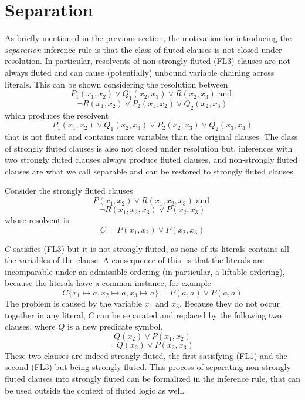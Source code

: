 \section{Separation}\label{sec:separation}
As briefly mentioned in the previous section, the motivation for introducing the \emph{separation} inference rule is that the class of fluted clauses is not closed under resolution.
In particular, resolvents of non-strongly fluted (FL3)-clauses are not always fluted and can cause (potentially) unbound variable chaining across literals.
This can be shown considering the resolution between
  \[
    P_1(x_1,x_2) \lor Q_1(x_2,x_3) \lor R(x_2,x_3) \text{ and }
  \]
  \[
  \neg R(x_1,x_2) \lor P_2(x_1,x_2) \lor Q_2(x_2,x_3)
  \]
which produces the resolvent
  \[
    P_1(x_1,x_2) \lor Q_1(x_2,x_3) \lor P_2(x_2,x_3) \lor Q_2(x_3,x_4)
  \]
that is not fluted and contains more variables than the original clauses.
The class of strongly fluted clauses is also not closed under resolution but, inferences with two strongly fluted clauses always produce fluted clauses, and non-strongly fluted clauses are what we call separable and can be restored to strongly fluted clauses.

Consider the strongly fluted clauses
  \[
    P(x_1,x_2) \lor R(x_1,x_2,x_3) \text{ and }
  \]
  \[
  \neg R(x_1,x_2,x_3) \lor P(x_2,x_3)
  \]
whose resolvent is
  \[
    C = P(x_1,x_2) \lor P(x_2,x_3)
  \]

\(C\) satisfies (FL3) but it is not strongly fluted, as none of its literals contains all the variables of the clause.
A consequence of this, is that the literals are incomparable under an admissible ordering (in particular, a liftable ordering), because the literals have a common instance, for example
  \[
    C\{x_1 \mapsto a, x_2 \mapsto a, x_3 \mapsto a\} = P(a,a) \lor P(a,a)
  \]
The problem is caused by the variable \(x_1 \text{ and } x_3\). Because they do not occur together in any literal, \(C\) can be separated and replaced by the following two clauses, where \(Q\) is a new predicate symbol.
  \[
    Q(x_2) \lor P(x_1,x_2)
  \]
  \[
    \neg Q(x_2) \lor P(x_2,x_3)
  \]
These two clauses are indeed strongly fluted, the first satisfying (FL1) and the second (FL3) but being strongly fluted.
This process of separating non-strongly fluted clauses into strongly fluted can be formalized in the  inference rule, that can be used outside the context of fluted logic as well.

